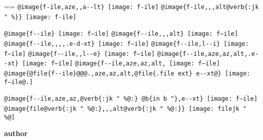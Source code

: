 \documentclass{book}
\makeatletter
\newenvironment{Texinfopreformatted}{%
  \par\GNUTobeylines\obeyspaces\frenchspacing\parskip=\z@\parindent=\z@}{}
{\catcode`\^^M=13 \gdef\GNUTobeylines{\catcode`\^^M=13 \def^^M{\null\par}}}
\newenvironment{Texinfoindented}{\begin{list}{}{}\item\relax}{\end{list}}
\renewcommand{\_}{\Texinfounderscore\discretionary{}{}{}}
\renewcommand{\includegraphics}[1]{\fbox{FIG \detokenize{#1}}}
\makeatother
\begin{document}
\begin{Texinfoindented}
\begin{Texinfopreformatted}
\texttt{@image\{f-ile,aze{,}{,}a{-}{-}lt\}}\ \texttt{[image: f-ile]}
\texttt{@image\{f-ile{,}{,},alt@verb\{:jk \_" \%\@\}\}}\ \texttt{[image: f-ile]}

\texttt{@image\{f{-}{-}ile\}}\ \texttt{[image: f--ile]}
\texttt{@image\{f{-}{-}ile{,}{,},alt\}}\ \texttt{[image: f--ile]}
\texttt{@image\{f{-}{-}ile{,}{,}{,}{,}.e-d-xt\}}\ \texttt{[image: f--ile]}
\texttt{@image\{f{-}{-}ile,l{-}{-}i\}}\ \texttt{[image: f--ile]}
\texttt{@image\{f{-}{-}ile{,}{,}l{-}{-}e\}}\ \texttt{[image: f--ile]}
\texttt{@image\{f{-}{-}ile,aze,az,alt,.e{-}{-}xt\}}\ \texttt{[image: f--ile]}
\texttt{@image\{f{-}{-}ile,aze,az,alt,}\ \texttt{[image: f--ile]}
\texttt{@image\{@file\{f{-}{-}ile\}@@@.,aze,az,alt,@file\{.file ext\}\ e{-}{-}xt@\}}\ \texttt{[image: f--ile@.]}

\texttt{@image\{f{-}{-}ile,aze,az,@verb\{:jk \_" \%@:\}\ @b\{in b "\},e{-}{-}xt\}}\ \texttt{[image: f--ile]}
\texttt{@image\{file@verb\{:jk \_" \%@:\}{,}{,},alt@verb\{:jk \_" \%@:\}\}}\ \texttt{[image: filejk \_" \\\%@]}


{\bfseries author}%


\end{Texinfopreformatted}
\end{Texinfoindented}
\end{document}
